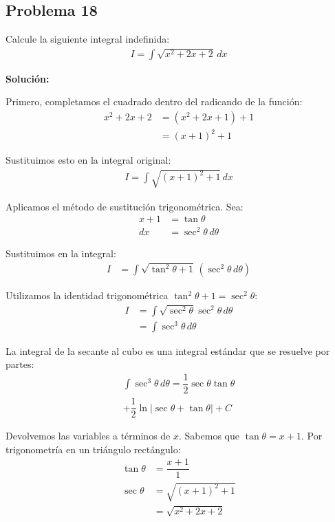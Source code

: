 \subsection*{Problema 18}

Calcule la siguiente integral indefinida:
\begin{align*}
I = \int \sqrt{x^2 + 2x + 2} \, dx
\end{align*}

\textbf{Solución:}

Primero, completamos el cuadrado dentro
del radicando de la función:
\begin{align*}
x^2 + 2x + 2 &= (x^2 + 2x + 1) + 1 \\
&= (x + 1)^2 + 1
\end{align*}

Sustituimos esto en la integral original:
\begin{align*}
I = \int \sqrt{(x + 1)^2 + 1} \, dx
\end{align*}

Aplicamos el método de sustitución
trigonométrica. Sea:
\begin{align*}
x + 1 &= \tan\theta \\
dx &= \sec^2\theta \, d\theta
\end{align*}

Sustituimos en la integral:
\begin{align*}
I &= \int \sqrt{\tan^2\theta + 1} \, (\sec^2\theta \, d\theta)
\end{align*}

Utilizamos la identidad trigonométrica
$\tan^2\theta + 1 = \sec^2\theta$:
\begin{align*}
I &= \int \sqrt{\sec^2\theta} \sec^2\theta \, d\theta \\
&= \int \sec^3\theta \, d\theta
\end{align*}

La integral de la secante al cubo es
una integral estándar que se resuelve por
partes:
\begin{align*}
\int \sec^3\theta \, d\theta = \dfrac{1}{2} \sec\theta \tan\theta \\
+ \dfrac{1}{2} \ln|\sec\theta + \tan\theta| + C
\end{align*}

Devolvemos las variables a términos de $x$.
Sabemos que $\tan\theta = x + 1$.
Por trigonometría en un triángulo rectángulo:
\begin{align*}
\tan\theta &= \dfrac{x + 1}{1} \\
\sec\theta &= \sqrt{(x + 1)^2 + 1} \\
&= \sqrt{x^2 + 2x + 2}
\end{align*}

